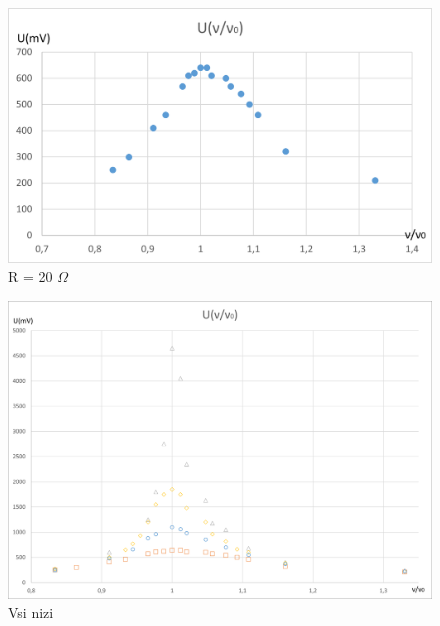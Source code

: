 \documentclass[a4paper]{report}
\begin{document}
\begin{figure}[htp]
    \centering
    \includegraphics[width=\textwidth]{R = 20.png}
    \caption{R = 20 $\Omega$}
    \label{fig:galaxy}
\end{figure}

\begin{figure}[htp]
    \centering
    \includegraphics[width=\textwidth]{vse.png}
    \caption{Vsi nizi}
    \label{fig:galaxy}
\end{figure}
\end{document}
